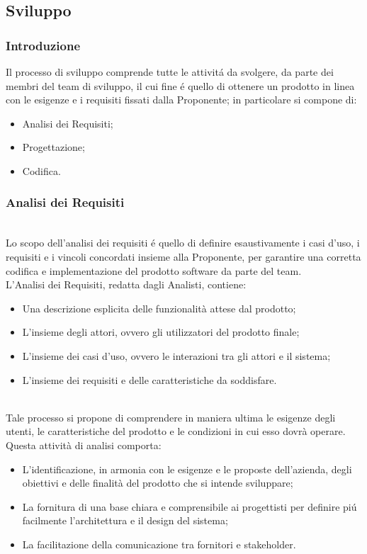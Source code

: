 \subsection{Sviluppo}

\subsubsection{Introduzione}
Il processo di sviluppo comprende tutte le attivitá da svolgere, da parte dei membri del team di sviluppo, il cui fine é quello di ottenere un prodotto in linea con le esigenze e i requisiti fissati dalla Proponente; in particolare si compone di:
\begin{itemize}
    \item Analisi dei Requisiti;
    \item Progettazione;
    \item Codifica.
\end{itemize} 

\subsubsection{Analisi dei Requisiti} \label{sec:analisi-rischi}

\\
Lo scopo dell'analisi dei requisiti é quello di definire esaustivamente i casi d'uso, i requisiti e i vincoli concordati insieme alla Proponente, per garantire una corretta codifica e implementazione del prodotto software da parte del team.\\
L'Analisi dei Requisiti, redatta dagli Analisti, contiene:
\begin{itemize}
    \item Una descrizione esplicita delle funzionalità attese dal prodotto;
    \item L'insieme degli attori, ovvero gli utilizzatori del prodotto finale;
    \item L'insieme dei casi d'uso, ovvero le interazioni tra gli attori e il sistema;
    \item L'insieme dei requisiti e delle caratteristiche da soddisfare.
\end{itemize}
\\
Tale processo si propone di comprendere in maniera ultima le esigenze degli utenti, le caratteristiche del prodotto e le condizioni in cui esso dovrà operare.\\
Questa attività di analisi comporta:
\begin{itemize}
    \item L'identificazione, in armonia con le esigenze e le proposte dell'azienda, degli obiettivi e delle finalità del prodotto che si intende sviluppare;
    \item La fornitura di una base chiara e comprensibile ai progettisti per definire piú facilmente l'architettura e il design del sistema;
    \item La facilitazione della comunicazione tra fornitori e stakeholder.
\end{itemize}
\\

